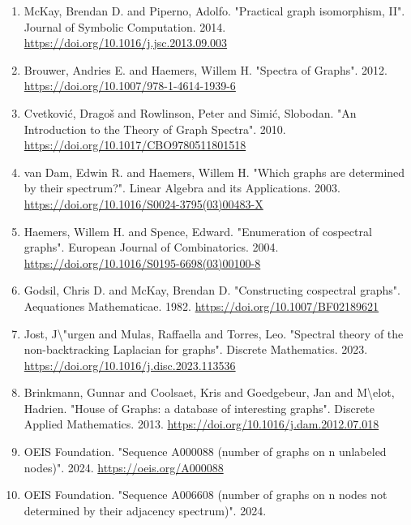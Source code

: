 \documentclass[
]{article}
\begin{document}
\begin{enumerate}
\def\labelenumi{\arabic{enumi}.}
\item
  \protect{}\label{ref-mckay2014}{}McKay, Brendan D. and Piperno, Adolfo. "Practical graph isomorphism, II". Journal of Symbolic Computation. 2014.
  \url{https://doi.org/10.1016/j.jsc.2013.09.003}
\item
  \protect{}\label{ref-brouwer2012}{}Brouwer, Andries E. and Haemers, Willem H. "Spectra of Graphs". 2012.
  \url{https://doi.org/10.1007/978-1-4614-1939-6}
\item
  \protect{}\label{ref-cvetkovic2010}{}Cvetković, Dragoš and Rowlinson, Peter and Simić, Slobodan. "An Introduction to the Theory of Graph Spectra". 2010.
  \url{https://doi.org/10.1017/CBO9780511801518}
\item
  \protect{}\label{ref-vandam2003}{}van Dam, Edwin R. and Haemers, Willem H. "Which graphs are determined by their spectrum?". Linear Algebra and its Applications. 2003.
  \url{https://doi.org/10.1016/S0024-3795(03)00483-X}
\item
  \protect{}\label{ref-haemers2004}{}Haemers, Willem H. and Spence, Edward. "Enumeration of cospectral graphs". European Journal of Combinatorics. 2004.
  \url{https://doi.org/10.1016/S0195-6698(03)00100-8}
\item
  \protect{}\label{ref-godsil1982}{}Godsil, Chris D. and McKay, Brendan D. "Constructing cospectral graphs". Aequationes Mathematicae. 1982.
  \url{https://doi.org/10.1007/BF02189621}
\item
  \protect{}\label{ref-jost2023}{}Jost, J\textbackslash"urgen and Mulas, Raffaella and Torres, Leo. "Spectral theory of the non-backtracking Laplacian for graphs". Discrete Mathematics. 2023.
  \url{https://doi.org/10.1016/j.disc.2023.113536}
\item
  \protect{}\label{ref-brinkmann2013}{}Brinkmann, Gunnar and Coolsaet, Kris and Goedgebeur, Jan and M\textbackslash\textquotesingle elot, Hadrien. "House of Graphs: a database of interesting graphs". Discrete Applied Mathematics. 2013.
  \url{https://doi.org/10.1016/j.dam.2012.07.018}
\item
  \protect{}\label{ref-oeis_a000088}{}OEIS Foundation. "Sequence A000088 (number of graphs on n unlabeled nodes)". 2024.
  \url{https://oeis.org/A000088}
\item
  \protect{}\label{ref-oeis_a006608}{}OEIS Foundation. "Sequence A006608 (number of graphs on n nodes not determined by their adjacency spectrum)". 2024.

\end{enumerate}
\end{document}
